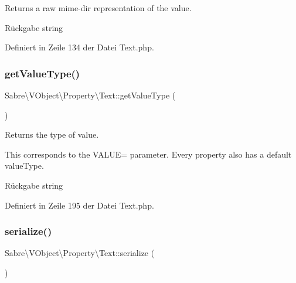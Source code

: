 Returns a raw mime-\/dir representation of the value.

\begin{DoxyReturn}{Rückgabe}
string 
\end{DoxyReturn}


Definiert in Zeile 134 der Datei Text.\+php.

\mbox{\label{class_sabre_1_1_v_object_1_1_property_1_1_text_a303e8d077a9ed92831150e57570b8144}} 
\subsubsection{\texorpdfstring{get\+Value\+Type()}{getValueType()}}
{\footnotesize\ttfamily Sabre\textbackslash{}\+V\+Object\textbackslash{}\+Property\textbackslash{}\+Text\+::get\+Value\+Type (\begin{DoxyParamCaption}{ }\end{DoxyParamCaption})}

Returns the type of value.

This corresponds to the V\+A\+L\+UE= parameter. Every property also has a \textquotesingle{}default\textquotesingle{} value\+Type.

\begin{DoxyReturn}{Rückgabe}
string 
\end{DoxyReturn}


Definiert in Zeile 195 der Datei Text.\+php.

\mbox{\label{class_sabre_1_1_v_object_1_1_property_1_1_text_a8f4d882ad6bbb6658cea980e583050ce}} 
\subsubsection{\texorpdfstring{serialize()}{serialize()}}
{\footnotesize\ttfamily Sabre\textbackslash{}\+V\+Object\textbackslash{}\+Property\textbackslash{}\+Text\+::serialize (\begin{DoxyParamCaption}{ }\end{DoxyParamCaption})}

